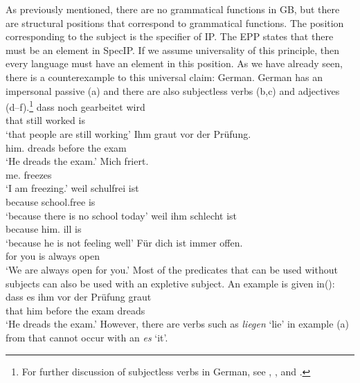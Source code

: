 As previously mentioned, there are no grammatical functions in GB, but there are structural positions that correspond to grammatical functions.
The position corresponding to the subject is the specifier of IP. The EPP states that there must be an element in SpecIP. If we assume universality
of this principle, then every language must have an element in this position. As we have already seen, there is a counterexample to this
universal claim: German. German has an impersonal passive (a) and there are also subjectless verbs (b,c) and adjectives (d--f).\footnote{%
	For further discussion of subjectless verbs in German, see , ,
    and .
}
\eal
\ex 
\gll dass noch gearbeitet wird\\
	 that still worked is\\
\glt `that people are still working'
\ex 
\gll Ihm graut vor der Prüfung.\\
     him.\dat{} dreads before the exam\\
\glt `He dreads the exam.'
\ex 
\gll Mich friert.\\
	 me.\acc{} freezes\\
\glt `I am freezing.'
\ex\label{ex-schulfrei}
\gll weil schulfrei ist\\
	 because school.free is\\
\glt `because there is no school today'
\ex\label{ex-schlecht-ist}
\gll weil ihm schlecht ist\\
	 because him.\dat{} ill is\\
\glt `because he is not feeling well'
\ex\label{ex-fuer-dich-ist-immer-offen}
\gll Für dich ist immer offen.\footnotemark\\
	 for you is always open\\
\glt `We are always open for you.'
\zl
Most of the predicates that can be used without subjects can also be used with an expletive subject. An example is given in():
\ea
\gll dass es ihm vor der Prüfung graut\\
	 that \expl{} him before the exam dreads\\
\glt `He dreads the exam.'
\z
However, there are verbs such as \emph{liegen} `lie' in example (a) from \citet[]{Reis82} that cannot occur with
an \emph{es} `it'.

\eal
{}
\zl

